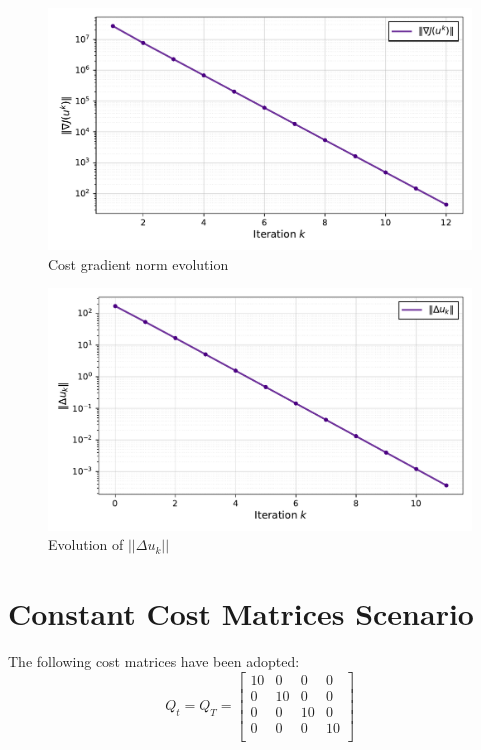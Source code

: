 \begin{figure}[htb]
    \centering
    \includegraphics[width=1\linewidth]{img/2-task2/grad_J_norm.pdf}
    \caption{Cost gradient norm evolution}
    \label{fig:armijo1}
\end{figure}

\begin{figure}[htb]
    \centering
    \includegraphics[width=1\linewidth]{img/2-task2/delta_u_norm.pdf}
    \caption{Evolution of $||\Delta u_k||$}
    \label{fig:armijo1}
\end{figure}

\clearpage


\newpage
\section{Constant Cost Matrices Scenario}

The following cost matrices have been adopted:
\begin{equation}
Q_t = Q_T
=
\begin{bmatrix}
    10 & 0 & 0 & 0\\
    0 & 10 & 0 & 0\\
    0 & 0 & 10 & 0\\
    0 & 0 & 0 & 10\\
\end{bmatrix}
\label{eq:CosntantQ}
\end{equation}

